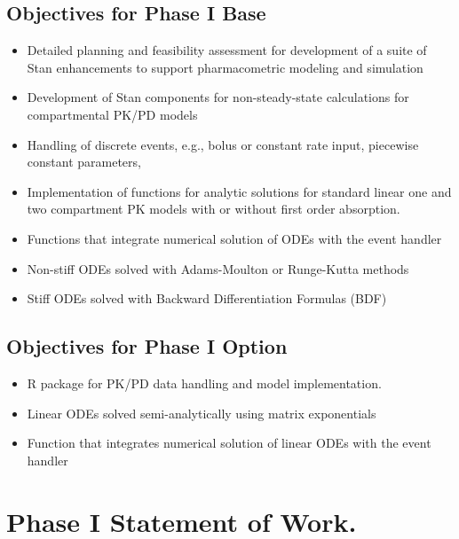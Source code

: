 \subsection{Objectives for Phase I Base}

\begin{itemize}
\item Detailed planning and feasibility assessment for development of
  a suite of Stan enhancements to support pharmacometric modeling and
  simulation
\item Development of Stan components for non-steady-state calculations
  for compartmental PK/PD models
\item Handling of discrete events, e.g., bolus or constant rate input,
  piecewise constant parameters,
\item Implementation of functions for analytic solutions for standard
  linear one and two compartment PK models with or without first order
  absorption.
\item Functions that integrate numerical solution of ODEs with the
  event handler
\item Non-stiff ODEs solved with Adams-Moulton or Runge-Kutta methods
\item Stiff ODEs solved with Backward Differentiation Formulas (BDF)
\end{itemize}

\subsection{Objectives for Phase I Option}

\begin{itemize}
\item R package for PK/PD data handling and model implementation.
\item Linear ODEs solved semi-analytically using matrix exponentials
\item Function that integrates numerical solution of linear ODEs
  with the event handler
\end{itemize}

\section{Phase I Statement of Work.}



